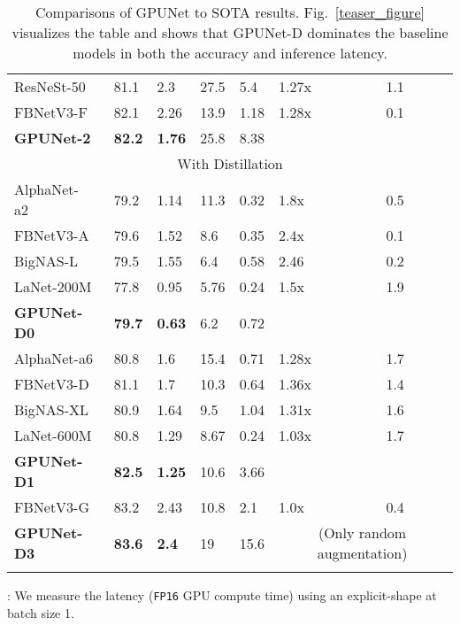 \documentclass[10pt,twocolumn,letterpaper]{article}
\begin{document}
\begin{table*}[!tb]
\begin{threeparttable}
\begin{tabular}{l l l l l l l}
		  ResNeSt-50~\cite{zhang2020resnest}          & 81.1 & 2.3  & 27.5  & 5.4    & 1.27x & 1.1\\
 		  FBNetV3-F                                   & 82.1 & 2.26 & 13.9  & 1.18   & 1.28x & 0.1\\
           \textbf{GPUNet-2} & \textbf{82.2} & \textbf{1.76}  &25.8   & 8.38   &  \\
		  \midrule
		  \multicolumn{7}{c}{With Distillation} \\
		  \midrule
		  AlphaNet-a2~\cite{wang2021alphanet}         & 79.2 & 1.14  & 11.3  & 0.32   & 1.8x & 0.5\\
		  FBNetV3-A                                   & 79.6 & 1.52  & 8.6   & 0.35   & 2.4x & 0.1\\
		  BigNAS-L~\cite{yu2020bignas}                & 79.5 & 1.55  & 6.4   & 0.58   & 2.46 & 0.2\\
		  LaNet-200M                                  & 77.8 & 0.95  & 5.76  & 0.24   & 1.5x & 1.9\\
		  \textbf{GPUNet-D0} & \textbf{79.7} & \textbf{0.63} &   6.2 & 0.72 &      \\
		  \midrule
		  AlphaNet-a6                                 & 80.8 & 1.6  & 15.4  & 0.71   & 1.28x & 1.7\\
		  FBNetV3-D                                   & 81.1 & 1.7  & 10.3  & 0.64   & 1.36x & 1.4\\
		  BigNAS-XL                                   & 80.9 & 1.64 & 9.5   & 1.04   & 1.31x  & 1.6\\
		  LaNet-600M                                  & 80.8 & 1.29 & 8.67  & 0.24  & 1.03x  & 1.7\\
\textbf{GPUNet-D1} & \textbf{82.5} & \textbf{1.25} &  10.6 & 3.66 &      \\
		  \midrule
		  FBNetV3-G                                   & 83.2 & 2.43 & 10.8   & 2.1   & 1.0x  & 0.4\\
		  \textbf{GPUNet-D3} & \textbf{83.6} & \textbf{2.4}  &  19 & 15.6    & \multicolumn{2}{c}{(Only random augmentation)} \\
		  \bottomrule
		  \label{table:nas_results}
    \end{tabular}
    \vspace{-0.15cm}
    \begin{tablenotes}
      \item : We measure the latency (\texttt{FP16} GPU compute time) using an explicit-shape at batch size 1.
    \end{tablenotes}
    \vspace{-0.2cm}
    \caption{Comparisons of GPUNet to SOTA results. Fig.~\ref{teaser_figure} visualizes the table and shows that GPUNet-D dominates the baseline models in both the accuracy and inference latency.}
    \label{table:nas-results}
\end{threeparttable}
\end{table*}
\end{document}
